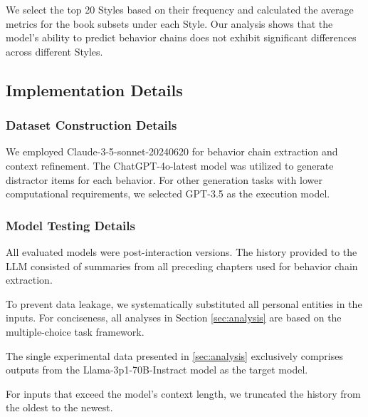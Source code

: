 We select the top 20 Styles based on their frequency and calculated the average metrics for the book subsets under each Style. 
Our analysis shows that the model's ability to predict behavior chains does not exhibit significant differences across different Styles.


\subsection{Implementation Details}

\subsubsection{Dataset Construction Details}
\label{sec:app_con}
We employed Claude-3-5-sonnet-20240620 for behavior chain extraction and context refinement. The ChatGPT-4o-latest model was utilized to generate distractor items for each behavior. For other generation tasks with lower computational requirements, we selected GPT-3.5 as the execution model.

\subsubsection{Model Testing Details}
\label{sec:app_exp}
All evaluated models were post-interaction versions. The history provided to the LLM consisted of summaries from all preceding chapters used for behavior chain extraction.

To prevent data leakage, we systematically substituted all personal entities in the inputs. For conciseness, all analyses in Section \ref{sec:analysis} are based on the multiple-choice task framework.

The single experimental data presented in \ref{sec:analysis} exclusively comprises outputs from the Llama-3p1-70B-Instract model as the target model.

For inputs that exceed the model's context length, we truncated the history from the oldest to the newest.












